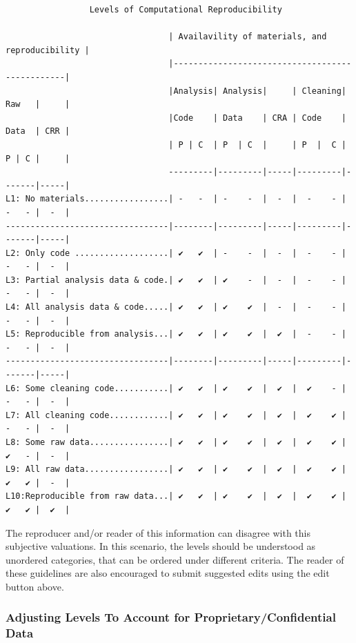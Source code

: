 \documentclass[]{book}
\begin{document}
\begin{verbatim}
                 Levels of Computational Reproducibility    

                                 | Availavility of materials, and reproducibility |
                                 |------------------------------------------------|
                                 |Analysis| Analysis|     | Cleaning| Raw   |     |
                                 |Code    | Data    | CRA | Code    | Data  | CRR |
                                 | P | C  | P  | C  |     | P  |  C | P | C |     |
                                 ---------|---------|-----|---------|-------|-----|
L1: No materials.................| -   -  | -    -  |  -  |  -    - | -   - |  -  |
---------------------------------|--------|---------|-----|---------|-------|-----|
L2: Only code ...................| ✔   ✔  | -    -  |  -  |  -    - | -   - |  -  |
L3: Partial analysis data & code.| ✔   ✔  | ✔    -  |  -  |  -    - | -   - |  -  |
L4: All analysis data & code.....| ✔   ✔  | ✔    ✔  |  -  |  -    - | -   - |  -  |
L5: Reproducible from analysis...| ✔   ✔  | ✔    ✔  |  ✔  |  -    - | -   - |  -  |
---------------------------------|--------|---------|-----|---------|-------|-----|
L6: Some cleaning code...........| ✔   ✔  | ✔    ✔  |  ✔  |  ✔    - | -   - |  -  |
L7: All cleaning code............| ✔   ✔  | ✔    ✔  |  ✔  |  ✔    ✔ | -   - |  -  |
L8: Some raw data................| ✔   ✔  | ✔    ✔  |  ✔  |  ✔    ✔ | ✔   - |  -  |
L9: All raw data.................| ✔   ✔  | ✔    ✔  |  ✔  |  ✔    ✔ | ✔   ✔ |  -  |
L10:Reproducible from raw data...| ✔   ✔  | ✔    ✔  |  ✔  |  ✔    ✔ | ✔   ✔ |  ✔  |
\end{verbatim}

The reproducer and/or reader of this information can disagree with this subjective valuations. In this scenario, the levels should be understood as unordered categories, that can be ordered under different criteria. The reader of these guidelines are also encouraged to submit suggested edits using the edit button above.

\hypertarget{adjusting-levels-to-account-for-proprietaryconfidential-data}{%
\subsubsection*{Adjusting Levels To Account for Proprietary/Confidential Data}\label{adjusting-levels-to-account-for-proprietaryconfidential-data}}
\end{document}
